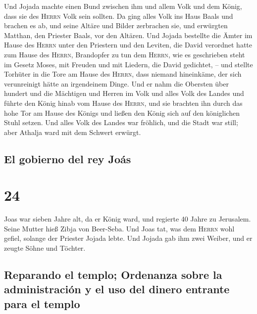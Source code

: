  Und Jojada machte einen Bund zwischen ihm und allem Volk
und dem König, dass sie des \textsc{Herrn} Volk sein sollten.
 Da ging alles Volk ins Haus Baals und brachen es ab, und
seine Altäre und Bilder zerbrachen sie, und erwürgten Matthan, den
Priester Baals, vor den Altären.  Und Jojada bestellte
die Ämter im Hause des \textsc{Herrn} unter den Priestern und den
Leviten, die David verordnet hatte zum Hause des \textsc{Herrn},
Brandopfer zu tun dem \textsc{Herrn}, wie es geschrieben steht im Gesetz
Moses, mit Freuden und mit Liedern, die David gedichtet, --
 und stellte Torhüter in die Tore am Hause des
\textsc{Herrn}, dass niemand hineinkäme, der sich verunreinigt hätte an
irgendeinem Dinge.  Und er nahm die Obersten über hundert
und die Mächtigen und Herren im Volk und alles Volk des Landes und
führte den König hinab vom Hause des \textsc{Herrn}, und sie brachten
ihn durch das hohe Tor am Hause des Königs und ließen den König sich auf
den königlichen Stuhl setzen.  Und alles Volk des Landes
war fröhlich, und die Stadt war still; aber Athalja ward mit dem Schwert
erwürgt.

\hypertarget{el-gobierno-del-rey-jouxe1s}{%
\subsection{El gobierno del rey
Joás}\label{el-gobierno-del-rey-jouxe1s}}

\hypertarget{section-23}{%
\section{24}\label{section-23}}

 Joas war sieben Jahre alt, da er König ward, und regierte
40 Jahre zu Jerusalem. Seine Mutter hieß Zibja von Beer-Seba.
 Und Joas tat, was dem \textsc{Herrn} wohl gefiel, solange
der Priester Jojada lebte.  Und Jojada gab ihm zwei
Weiber, und er zeugte Söhne und Töchter.

\hypertarget{reparando-el-templo-ordenanza-sobre-la-administraciuxf3n-y-el-uso-del-dinero-entrante-para-el-templo}{%
\subsection{Reparando el templo; Ordenanza sobre la administración y el
uso del dinero entrante para el
templo}\label{reparando-el-templo-ordenanza-sobre-la-administraciuxf3n-y-el-uso-del-dinero-entrante-para-el-templo}}

